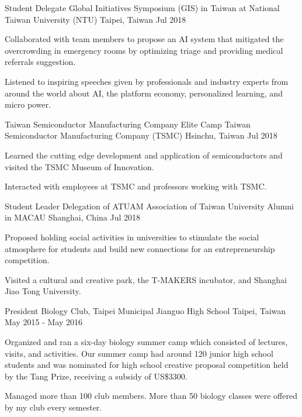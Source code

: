 \begin{cventries}
    \cventry
    {Student Delegate} %
    {Global Initiatives Symposium (GIS) in Taiwan at National Taiwan University (NTU)} %
    {Taipei, Taiwan} %
    {Jul 2018} %
    {
	\begin{cvitems} %
      	\item Collaborated with team members to propose an AI system that mitigated the overcrowding in emergency rooms by optimizing triage and providing medical referrals suggestion. 
      	\item Listened to inspiring speeches given by professionals and industry experts from around the world about AI, the platform economy, personalized learning, and micro power.
	\end{cvitems}
    }  
    
    \cventry
    {Taiwan Semiconductor Manufacturing Company Elite Camp} %
    {Taiwan Semiconductor Manufacturing Company (TSMC)} %
    {Hsinchu, Taiwan} %
    {Jul 2018} %
    {
	\begin{cvitems} %
      	\item Learned the cutting edge development and application of semiconductors and visited the TSMC Museum of Innovation. 
      	\item Interacted with employees at TSMC and professors working with TSMC.
	\end{cvitems}
    } 
    
     \cventry
    {Student Leader Delegation of ATUAM} %
    {Association of Taiwan University Alumni in MACAU} %
    {Shanghai, China} %
    {Jul 2018} %
    {
	\begin{cvitems} %
      	\item Proposed holding social activities in universities to stimulate the social atmosphere for students and build new connections for an entrepreneurship competition. 
      	\item Visited a cultural and creative park, the T-MAKERS incubator, and Shanghai Jiao Tong University.
	\end{cvitems}
    } 
    
    \cventry
    {President} %
    {Biology Club, Taipei Municipal Jianguo High School} %
    {Taipei, Taiwan} %
    {May 2015 - May 2016} %
    {
	\begin{cvitems} %
      	\item Organized and ran a six-day biology summer camp which consisted of lectures, visits, and activities. Our summer camp had around 120 junior high school students and was nominated for high school creative proposal competition held by the Tang Prize, receiving a subsidy of US\$3300. 
      	\item Managed more than 100 club members. More than 50 biology classes were offered by my club every semester.
	\end{cvitems}
    } 
    
    

\end{cventries}
